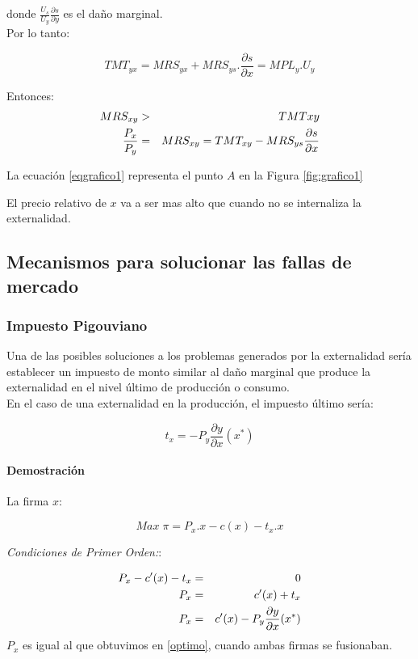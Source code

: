 donde $\frac{U_s}{U_y}\frac{\partial s}{\partial y}$ es el daño
marginal. \\

Por lo tanto:

$$TMT_{yx} = MRS_{yx}+MRS_{ys}.\frac{\partial
 s}{\partial{x}}=MPL_y.U_y$$

Entonces:
\begin{eqnarray}
	MRS_{xy}&>&TMT{xy} \label{eqgrafico1}\\
	\frac{P_x}{P_y}&=&MRS_{xy}=TMT_{xy}-MRS_{ys}\frac{\partial
s}{\partial{x}} \nonumber
\end{eqnarray}

La ecuación \ref{eqgrafico1} representa el punto $A$ en la Figura \ref{fig:grafico1}

El precio relativo de $x$ va a ser mas alto que cuando no se
internaliza la externalidad.

\subsection{Mecanismos para solucionar las fallas de mercado}

\subsubsection{Impuesto Pigouviano}
Una de las posibles soluciones a los problemas generados por la externalidad
sería establecer un impuesto de monto similar al daño marginal que produce la
externalidad en el nivel último de producción o consumo. \\
En el caso de una externalidad en la producción, el impuesto último
sería:

$$t_x=-P_y\frac{\partial y}{\partial x}(x^*)$$

\paragraph{Demostración}

La firma $x$:

$$ Max \; \pi = P_x.x-c(x)-t_x.x$$

\emph{Condiciones de Primer Orden:}:

\begin{eqnarray}
 P_x-c'(x)-t_x &=& 0 \nonumber \\
 P_x &=&c'(x)+t_x \nonumber \\
 P_x &=&c'(x)-P_y \frac{\partial y}{\partial x}(x^*) \label{optimo2}
\end{eqnarray}
$P_x$ es igual al que obtuvimos en \ref{optimo}, cuando ambas firmas
se fusionaban.\\

